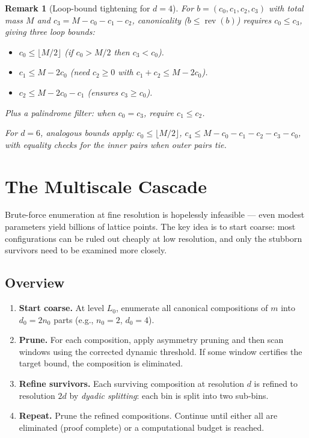 \documentclass[11pt, letterpaper]{article}
\theoremstyle{paperplain}
\theoremstyle{paperdef}
\newtheorem{remark}[theorem]{Remark}
\newcommand{\rev}{\operatorname{rev}}
\begin{document}
\begin{remark}[Loop-bound tightening for $d = 4$]
For $b = (c_0, c_1, c_2, c_3)$ with total mass $M$ and
$c_3 = M - c_0 - c_1 - c_2$,
canonicality ($b \le \rev(b)$) requires $c_0 \le c_3$, giving three
loop bounds:
\begin{itemize}
  \item $c_0 \le \lfloor M/2 \rfloor$ \quad (if $c_0 > M/2$ then
    $c_3 < c_0$).
  \item $c_1 \le M - 2c_0$ \quad (need $c_2 \ge 0$ with
    $c_1 + c_2 \le M - 2c_0$).
  \item $c_2 \le M - 2c_0 - c_1$ \quad (ensures $c_3 \ge c_0$).
\end{itemize}
Plus a palindrome filter: when $c_0 = c_3$, require $c_1 \le c_2$.

For $d = 6$, analogous bounds apply: $c_0 \le \lfloor M/2 \rfloor$,
$c_4 \le M - c_0 - c_1 - c_2 - c_3 - c_0$, with equality checks for
the inner pairs when outer pairs tie.
\end{remark}


\section{The Multiscale Cascade}\label{sec:cascade}

Brute-force enumeration at fine resolution is hopelessly infeasible ---
even modest parameters yield billions of lattice points.  The key idea
is to start
coarse: most configurations can be ruled out cheaply at low resolution,
and only the stubborn survivors need to be examined more closely.

\subsection{Overview}

\begin{enumerate}[label=\textbf{Step \arabic*:}]
  \item \textbf{Start coarse.}  At level $L_0$, enumerate all
    canonical compositions of $m$ into $d_0 = 2n_0$ parts
    (e.g., $n_0 = 2$, $d_0 = 4$).

  \item \textbf{Prune.}  For each composition, apply asymmetry
    pruning and then scan windows using the corrected dynamic
    threshold.  If some window certifies the target bound, the
    composition is eliminated.

  \item \textbf{Refine survivors.}  Each surviving composition at
    resolution $d$ is refined to resolution $2d$ by \emph{dyadic
    splitting}: each bin is split into two sub-bins.

  \item \textbf{Repeat.}  Prune the refined compositions.  Continue
    until either all are eliminated (proof complete) or a
    computational budget is reached.
\end{enumerate}
\end{document}
